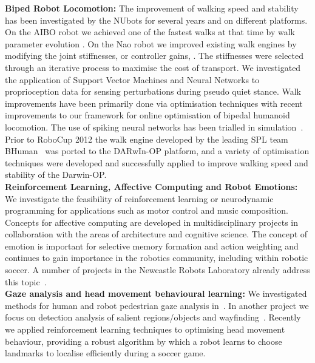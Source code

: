 \documentclass{llncs}
\begin{document}
\noindent\textbf{Biped Robot Locomotion:} The improvement of walking speed and stability has been investigated by the NUbots for several years and on different platforms. On the AIBO robot we achieved one of the fastest walks at that time by walk parameter evolution \cite{QuinlanEtAlACRA2003,ChalupEtAlSMC2007}. On the Nao robot we improved existing walk engines by modifying the joint stiffnesses, or controller gains, \cite{Kulk2008,Kulk2010,Kulk2010a}. The stiffnesses were selected through an iterative process to maximise the cost of transport. We investigated the application of Support Vector Machines and Neural Networks to proprioception data for sensing perturbations during pseudo quiet stance. Walk improvements have been primarily done via optimisation techniques \cite{Kulk2011a,Kulk2011b} with recent improvements to our framework for online optimisation of bipedal humanoid locomotion. 
The use of spiking neural networks has been trialled in simulation~\cite{WiklendtChalup2008}. Prior to RoboCup 2012 the walk engine developed by the leading SPL team BHuman~\cite{BHumanWalk2010} was ported to the DARwIn-OP platform, and a variety of optimisation techniques were developed and successfully applied to improve walking speed and stability of the Darwin-OP. 
\\

\noindent\textbf{Reinforcement Learning, Affective Computing and Robot Emotions:} We investigate the feasibility of reinforcement learning or neurodynamic programming for applications such as motor control and music composition. Concepts for affective computing are developed in multidisciplinary projects in collaboration with the areas of architecture and cognitive science. The concept of emotion is important for selective memory formation and action weighting and continues to gain importance in the robotics community, including within robotic soccer. A number of projects in the Newcastle Robots Laboratory already address this topic~\cite{ANFA2012,Pareidolia2010,HongEtAl2013a,HongEtAl2013b,WongEtAl2013}. 
\\

\noindent\textbf{Gaze analysis and head movement behavioural learning:} We investigated methods for human and robot pedestrian gaze analysis in~\cite{JalalianEtAl_CAADRIA2011,WongEtAl2012}. In another project we focus on detection analysis of salient regions/objects and wayfinding~\cite{BhatiaEtAl2012}. Recently we  applied reinforcement learning techniques to optimising head movement behaviour, providing a robust algorithm by which a robot learns to choose landmarks to localise efficiently during a soccer game. 
\\
\end{document}
